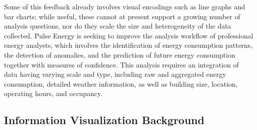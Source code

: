 Some of this feedback already involves visual encodings such as line graphs and bar charts; while useful, these cannot at present support a growing number of analysis questions, nor do they scale the size and heterogeneity of the data collected. 
Pulse Energy is seeking to improve the analysis workflow of professional energy analysts, which involves the identification of energy consumption patterns, the detection of anomalies, and the prediction of future energy consumption together with measures of confidence. 
This analysis requires an integration of data having varying scale and type, including raw and aggregated energy consumption, detailed weather information, as well as building size, location, operating hours, and occupancy.

\subsection{Information Visualization Background}
\label{app:emu:proposal-infovis-background}

